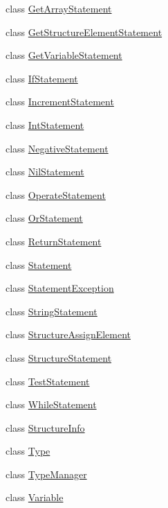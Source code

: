 \begin{DoxyCompactItemize}
class \hyperlink{class_scribble_core_1_1_get_array_statement}{Get\-Array\-Statement}
\item 
class \hyperlink{class_scribble_core_1_1_get_structure_element_statement}{Get\-Structure\-Element\-Statement}
\item 
class \hyperlink{class_scribble_core_1_1_get_variable_statement}{Get\-Variable\-Statement}
\item 
class \hyperlink{class_scribble_core_1_1_if_statement}{If\-Statement}
\item 
class \hyperlink{class_scribble_core_1_1_increment_statement}{Increment\-Statement}
\item 
class \hyperlink{class_scribble_core_1_1_int_statement}{Int\-Statement}
\item 
class \hyperlink{class_scribble_core_1_1_negative_statement}{Negative\-Statement}
\item 
class \hyperlink{class_scribble_core_1_1_nil_statement}{Nil\-Statement}
\item 
class \hyperlink{class_scribble_core_1_1_operate_statement}{Operate\-Statement}
\item 
class \hyperlink{class_scribble_core_1_1_or_statement}{Or\-Statement}
\item 
class \hyperlink{class_scribble_core_1_1_return_statement}{Return\-Statement}
\item 
class \hyperlink{class_scribble_core_1_1_statement}{Statement}
\item 
class \hyperlink{class_scribble_core_1_1_statement_exception}{Statement\-Exception}
\item 
class \hyperlink{class_scribble_core_1_1_string_statement}{String\-Statement}
\item 
class \hyperlink{class_scribble_core_1_1_structure_assign_element}{Structure\-Assign\-Element}
\item 
class \hyperlink{class_scribble_core_1_1_structure_statement}{Structure\-Statement}
\item 
class \hyperlink{class_scribble_core_1_1_test_statement}{Test\-Statement}
\item 
class \hyperlink{class_scribble_core_1_1_while_statement}{While\-Statement}
\item 
class \hyperlink{class_scribble_core_1_1_structure_info}{Structure\-Info}
\item 
class \hyperlink{class_scribble_core_1_1_type}{Type}
\item 
class \hyperlink{class_scribble_core_1_1_type_manager}{Type\-Manager}
\item 
class \hyperlink{class_scribble_core_1_1_variable}{Variable}
\end{DoxyCompactItemize}
